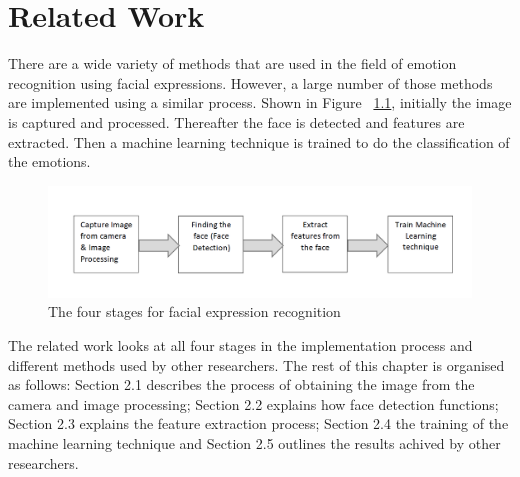 ﻿\chapter{Related Work}

There are a wide variety of methods that are used in the field of emotion recognition using facial expressions. However, a large number of those methods are implemented using a similar process. Shown in Figure ~\ref{fig:process}, initially the image is captured and processed. Thereafter the face is detected and features are extracted. Then a machine learning technique is trained to do the classification of the emotions. 

\begin{figure}[ht]
  \centering
  \includegraphics[scale=0.4]{4}
  \caption{The four stages for facial expression recognition}
  \label{fig:process}
\end{figure}
The related work looks at all four stages in the implementation process and different methods used by other researchers. The rest of this chapter is organised as follows: Section 2.1 describes the process of obtaining the image from the camera and image processing; Section 2.2 explains how face detection functions; Section 2.3 explains the feature extraction process; Section 2.4 the training of the machine learning technique and Section 2.5 outlines the results achived by other researchers.
